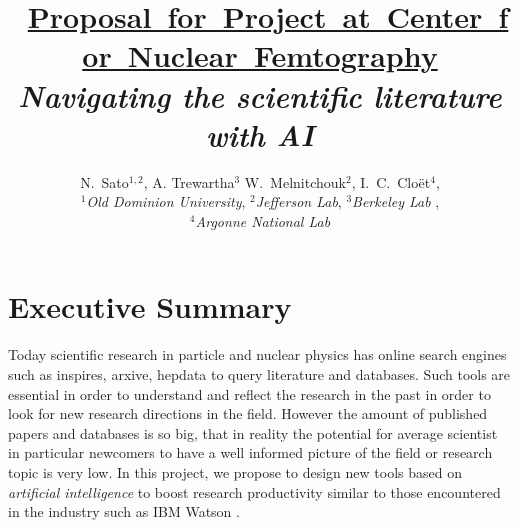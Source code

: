 \documentclass{article}[12pt,preprint]
\begin{document}
\title{\mbox{\large
	\underline{Proposal for Project at Center for Nuclear Femtography}}
\vspace{0.6cm}
\\ \emph{Navigating the scientific literature with AI}
\vspace{0.2cm}
}

\author{
  N.~Sato$^{1,2}$,
  A. Trewartha$^{3}$ 
	W.~Melnitchouk$^2$,
	I.~C.~Clo\"et$^4$,
	\vspace{0.3cm}
\\
$^1${\it Old Dominion University},
$^2${\it Jefferson Lab},
$^3${\it Berkeley Lab },
\\$^4${\it Argonne National Lab}}

\vspace{-6ex}

\date{}

\maketitle

\noindent \color{black}

\section{Executive Summary}

Today scientific research in particle and nuclear physics has online
search engines such as inspires, arxive, hepdata to query 
literature and databases.  Such tools are essential in order to
understand and reflect the research in the past in order to look for 
new research directions in the field.  However the amount of
published papers and databases is so big, that in reality the
potential for average scientist in particular newcomers to have a well
informed picture of the field or research topic is very low.  In this
project, we propose to design new tools based on \emph{artificial
intelligence} to boost research productivity similar to those
encountered in the industry such as IBM Watson \cite{...}. 


\end{document}
